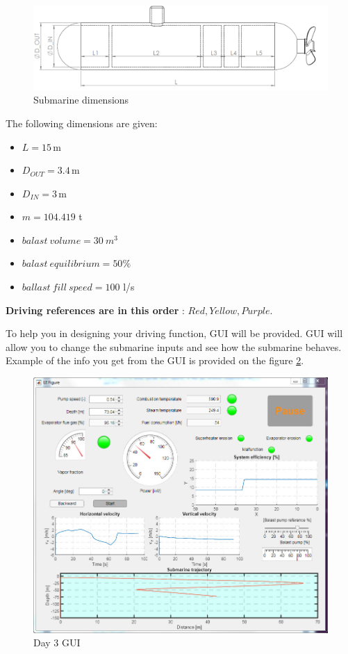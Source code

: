 \documentclass[openany]{book}
\begin{document}
\begin{figure}[h!]
	\centering
	\includegraphics[width=\textwidth]{submarine_side_view.png}
	\caption{Submarine dimensions}
	\label{fig:side_view}
\end{figure}

The following dimensions are given:
\begin{itemize}
	\item $L = 15 \,\textrm{m}$
	\item $D_{OUT} = 3.4 \,\textrm{m}$
	\item $D_{IN} = 3 \,\textrm{m}$
	\item $m = 104.419$ t
	\item $balast\ volume = 30 \ m^3$
	\item $balast\ equilibrium = 50\%$
	\item $ballast\ fill\ speed = 100$ l/s
\end{itemize}


\textbf{Driving references are in this order} : $Red, Yellow, Purple$.


To help you in designing your driving function, GUI will be provided. GUI will allow you to change the submarine inputs and see how the submarine behaves. Example of the info you get from the GUI is provided on the figure \ref{fig:gui3}.

\begin{figure}[h!]
	\centering
	\includegraphics[width=\textwidth]{gui3}
	\caption{Day 3 GUI}
	\label{fig:gui3}
\end{figure}
\end{document}
